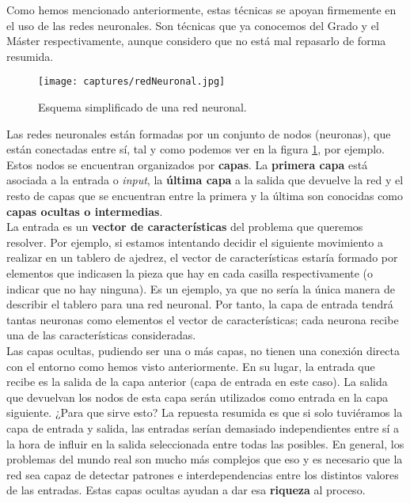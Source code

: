 \documentclass[11pt,fleqn]{book} %
\begin{document}
Como hemos mencionado anteriormente, estas técnicas se apoyan firmemente en el uso de las redes neuronales. Son técnicas que ya conocemos del Grado y el Máster respectivamente, aunque considero que no está mal repasarlo de forma resumida. \cite{article:redesNeuronalesMicrosoft} \cite{book:TFGredes} \cite{book:berzal} \cite{article:redesNeuronales} \cite{article:RLromero} \\

\begin{figure}[H]
	\centering\texttt{[image: captures/redNeuronal.jpg]}
	\caption{Esquema simplificado de una red neuronal. \cite{article:redNeuronal}}
	\label{fig:redNeuronal} %
\end{figure}

Las redes neuronales están formadas por un conjunto de nodos (neuronas), que están conectadas entre sí, tal y como podemos ver en la figura \ref{fig:redNeuronal}, por ejemplo. \\

Estos nodos se encuentran organizados por \textbf{capas}. La \textbf{primera capa} está asociada a la entrada o \textit{input}, la \textbf{última capa} a la salida que devuelve la red y el resto de capas que se encuentran entre la primera y la última son conocidas como \textbf{capas ocultas o intermedias}. \\

La entrada es un \textbf{vector de características} del problema que queremos resolver. Por ejemplo, si estamos intentando decidir el siguiente movimiento a realizar en un tablero de ajedrez, el vector de características estaría formado por elementos que indicasen la pieza que hay en cada casilla respectivamente (o indicar que no hay ninguna). Es un ejemplo, ya que no sería la única manera de describir el tablero para una red neuronal. Por tanto, la capa de entrada tendrá tantas neuronas como elementos el vector de características; cada neurona recibe una de las características consideradas. \\

Las capas ocultas, pudiendo ser una o más capas, no tienen una conexión directa con el entorno como hemos visto anteriormente. En su lugar, la entrada que recibe es la salida de la capa anterior (capa de entrada en este caso). La salida que devuelvan los nodos de esta capa serán utilizados como entrada en la capa siguiente. ¿Para que sirve esto? La repuesta resumida es que si solo tuviéramos la capa de entrada y salida, las entradas serían demasiado independientes entre sí a la hora de influir en la salida seleccionada entre todas las posibles. En general, los problemas del mundo real son mucho más complejos que eso y es necesario que la red sea capaz de detectar patrones e interdependencias entre los distintos valores de las entradas. Estas capas ocultas ayudan a dar esa \textbf{riqueza} al proceso.\cite{article:redNeuronal2}\\
\end{document}
